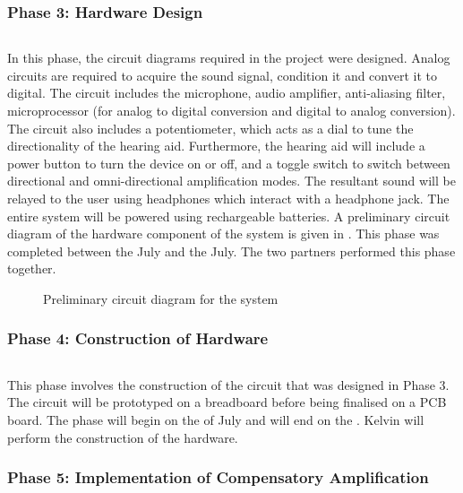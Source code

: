 \documentclass[10pt,twocolumn]{witseiepaper}
\begin{document}
\subsubsection*{Phase 3: Hardware Design } $    $

In this phase, the circuit diagrams required in the project were designed. Analog circuits are required to acquire the sound signal, condition it and convert it to digital. The circuit includes the microphone, audio amplifier, anti-aliasing filter, microprocessor (for analog to digital conversion and digital to analog conversion). The circuit also includes a potentiometer, which acts as a dial to tune the directionality of the hearing aid. Furthermore, the hearing aid will include a power button to turn the device on or off, and a toggle switch to switch between directional and omni-directional amplification modes. The resultant sound will be relayed to the user using headphones which interact with a headphone jack. The entire system will be powered using rechargeable batteries. A preliminary circuit diagram of the hardware component of the system is given in . This phase was completed between the  July and the  July. The two partners performed this phase together.

\begin{figure}[h]
	\centering
	\caption{Preliminary circuit diagram for the system}
	\raggedright
	\label{fig:circuit}	
\end{figure}

\subsubsection*{Phase 4: Construction of Hardware } $    $

This phase involves the construction of the circuit that was designed in Phase 3. The circuit will be prototyped on a breadboard before being finalised on a PCB board. The phase will begin on the  of July and will end on the . Kelvin will perform the construction of the hardware.

\subsubsection*{Phase 5: Implementation of Compensatory Amplification} $    $
\end{document}
